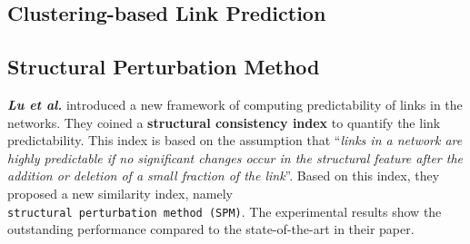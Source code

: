 \subsection{Clustering-based Link Prediction}

\subsection{Structural Perturbation Method}

\textbf{\emph{Lu et al.}} introduced a new framework of computing
predictability of links in the networks. They coined a
\textbf{structural consistency index} to quantify the link
predictability. This index is based on the assumption that ``\emph{links
    in a network are highly predictable if no significant changes occur in
    the structural feature after the addition or deletion of a small
    fraction of the link}''. Based on this index, they proposed a new
similarity index, namely
\texttt{structural\ perturbation\ method\ (SPM)}. The experimental
results show the outstanding performance compared to the
state-of-the-art in their paper.